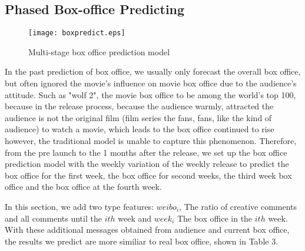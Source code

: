 \subsection{Phased Box-office Predicting}
\begin{figure}[!htbp]
\centering
\texttt{[image: boxpredict.eps]}
\caption{Multi-stage box office prediction model}
\label{fig:mhin}
\end{figure}
In the past prediction of box office, we usually only forecast the overall box office, but often ignored the movie's influence on movie box office due to the audience's attitude. Such as "wolf 2", the movie box office to be among the world's top 100, because in the release process, because the audience warmly, attracted the audience is not the original film (film series the fans, fans, like the kind of audience) to watch a movie, which leads to the box office continued to rise however, the traditional model is unable to capture this phenomenon. Therefore, from the pre launch to the 1 months after the release, we set up the box office prediction model with the weekly variation of the weekly release to predict the box office for the first week, the box office for second weeks, the third week box office and the box office at the fourth week.\\
\par In this section, we add two type features: $weibo_i$, The ratio of creative comments and all comments until the $ith$ week
and $week_i$ The box office in the $ith$ week. With these additional messages obtained from audience and current box office, the results we predict are more similiar to real box office, shown in Table 3.
